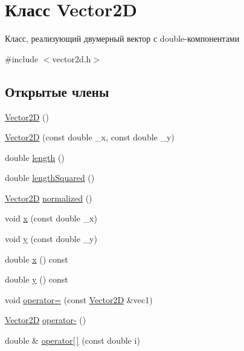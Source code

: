 \hypertarget{class_vector2_d}{}\section{Класс Vector2D}
\label{class_vector2_d}


Класс, реализующий двумерный вектор с double-\/компонентами  




{\ttfamily \#include $<$vector2d.\+h$>$}

\subsection*{Открытые члены}
\begin{DoxyCompactItemize}
\item 
\mbox{\hyperlink{class_vector2_d_a98e9997ebb7a629f4db52397d4e0d653}{Vector2D}} ()
\item 
\mbox{\hyperlink{class_vector2_d_a0a97f6900bdb81fcefe6c37f1100532a}{Vector2D}} (const double \+\_\+x, const double \+\_\+y)
\item 
double \mbox{\hyperlink{class_vector2_d_a56b4174bc06988a5df894457c09d9677}{length}} ()
\item 
double \mbox{\hyperlink{class_vector2_d_a809281a82c36622fc67f96ec4ee2bbbc}{length\+Squared}} ()
\item 
\mbox{\hyperlink{class_vector2_d}{Vector2D}} \mbox{\hyperlink{class_vector2_d_a37ab07daec20b3bbdf8742cb8799f291}{normalized}} ()
\item 
void \mbox{\hyperlink{class_vector2_d_af38f392fab690d3fe42dbb248fbe46c7}{x}} (const double \+\_\+x)
\item 
void \mbox{\hyperlink{class_vector2_d_a544f0184543c286f599630ad9d390ce7}{y}} (const double \+\_\+y)
\item 
double \mbox{\hyperlink{class_vector2_d_a00b90f2937ea343d8cad1c3b4a340baf}{x}} () const
\item 
double \mbox{\hyperlink{class_vector2_d_a4989f56e0e142a183ba3b9127f2fa794}{y}} () const
\item 
void \mbox{\hyperlink{class_vector2_d_a7966363669d4914b5554d5a8e93ea7d3}{operator=}} (const \mbox{\hyperlink{class_vector2_d}{Vector2D}} \&vec1)
\item 
\mbox{\hyperlink{class_vector2_d}{Vector2D}} \mbox{\hyperlink{class_vector2_d_a4eb1b4403004c8632bb2468cf1942ea5}{operator-\/}} ()
\item 
double \& \mbox{\hyperlink{class_vector2_d_a36aeaa2a8025f6307489b8f57220c760}{operator\mbox{[}$\,$\mbox{]}}} (const double i)
\end{DoxyCompactItemize}
